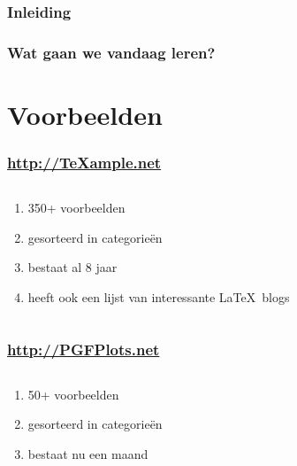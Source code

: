 \documentclass[]{beamer}
\begin{document}
\begin{frame}
  \frametitle{Inleiding}
\end{frame}

\begin{frame}
  \frametitle{Wat gaan we vandaag leren?}
\end{frame}

\section{Voorbeelden}

\begin{frame}
  \frametitle{\url{http://TeXample.net}}

  \begin{columns}
    \begin{column}{.4\textwidth}
      \begin{enumerate}
        \item 350+ voorbeelden
        \item gesorteerd in categorie\"en
        \item bestaat al 8 jaar
        \item heeft ook een lijst van interessante \LaTeX\ blogs
      \end{enumerate}
    \end{column}

    \begin{column}{.6\textwidth}
      \begin{flushright}
        
      \end{flushright}
    \end{column}
  \end{columns}
\end{frame}

\begin{frame}
  \frametitle{\url{http://PGFPlots.net}}

  \begin{columns}
    \begin{column}{.4\textwidth}
      \begin{enumerate}
        \item 50+ voorbeelden
        \item gesorteerd in categorie\"en
        \item bestaat nu een maand
      \end{enumerate}
    \end{column}

    \begin{column}{.6\textwidth}
      \begin{flushright}
        
      \end{flushright}
    \end{column}
  \end{columns}
\end{frame}
\end{document}
